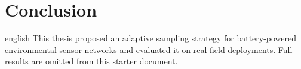 \chapter{Conclusion}
\label{chap-conclusion}

\begin{otherlanguage*}{english}
This thesis proposed an adaptive sampling strategy for battery-powered
environmental sensor networks and evaluated it on real field deployments.
Full results are omitted from this starter document.
\end{otherlanguage*}
